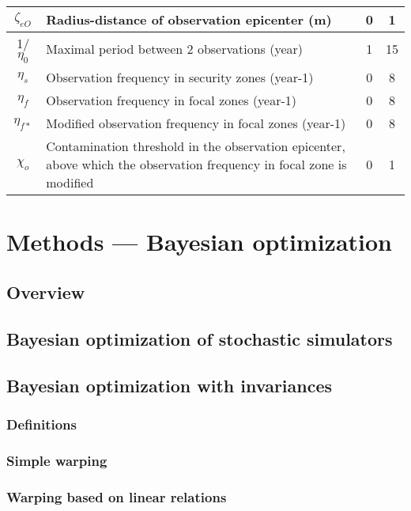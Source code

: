\begin{table}[htbp]
\begin{tabular}{|c|p{33.785em}|c|c|}
		\midrule
		$\zeta_{eO}$ & Radius-distance of observation epicenter (m) & 0     & 1 \\
		\midrule
		1/$\eta_{0}$  & Maximal period between 2 observations (year) & 1     & 15 \\
		\midrule
		$\eta_{s}$    & Observation frequency in security zones (year-1) & 0     & 8 \\
		\midrule
		$\eta_{f}$    & Observation frequency in focal zones (year-1) & 0     & 8 \\
		\midrule
		$\eta_{f*}$   & Modified observation frequency in focal zones (year-1) & 0     & 8 \\
		\midrule
		$\chi_{o}$    & Contamination threshold in the observation epicenter, above which the observation frequency in focal zone is modified & 0     & 1 \\
		\bottomrule
	\end{tabular}%
	\label{tab:addlabel}%
\end{table}%



\section{Methods — Bayesian optimization}

\subsection{Overview}

\subsection{Bayesian optimization of stochastic simulators}

\subsection{Bayesian optimization with invariances}

\subsubsection{Definitions}

\subsubsection{Simple warping}

\subsubsection{Warping based on linear relations}

